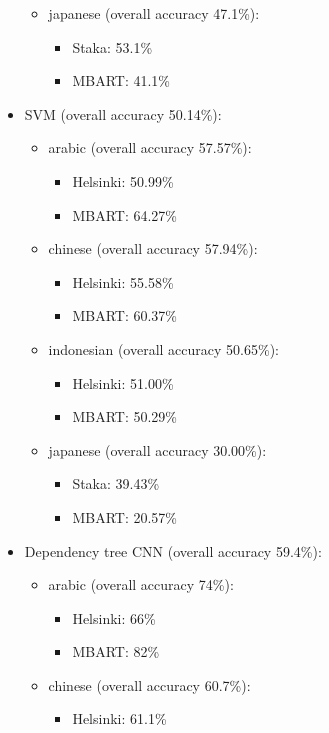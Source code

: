 \documentclass[twocolumn]{article}
\begin{document}
\begin{itemize}
\begin{itemize}
		\item{japanese} (overall accuracy 47.1\%):
		\begin{itemize}
			\item Staka: 53.1\%
			\item MBART: 41.1\%
		\end{itemize}
		\end{itemize}
	\item SVM (overall accuracy 50.14\%):
		\begin{itemize}
		\item{arabic (overall accuracy 57.57\%)}:
  		\begin{itemize}
			\item Helsinki: 50.99\%
			\item MBART: 64.27\%
		\end{itemize}
		\item{chinese (overall accuracy 57.94\%)}:
            \begin{itemize}
			\item Helsinki: 55.58\%
			\item MBART: 60.37\%
		\end{itemize}
		\item{indonesian (overall accuracy 50.65\%)}:
            \begin{itemize}
			\item Helsinki: 51.00\%
			\item MBART: 50.29\%
		\end{itemize}
            \item{japanese (overall accuracy 30.00\%)}:
            \begin{itemize}
			\item Staka: 39.43\%
			\item MBART: 20.57\%
		\end{itemize}
            \end{itemize}
	\item Dependency tree CNN (overall accuracy 59.4\%):
		\begin{itemize}
		\item{arabic} (overall accuracy 74\%): 
		\begin{itemize}
			\item Helsinki: 66\%
			\item MBART: 82\%
		\end{itemize}
		\item{chinese} (overall accuracy 60.7\%): 
		\begin{itemize}
			\item Helsinki: 61.1\%

\end{itemize}
\end{itemize}
\end{itemize}
\end{document}
